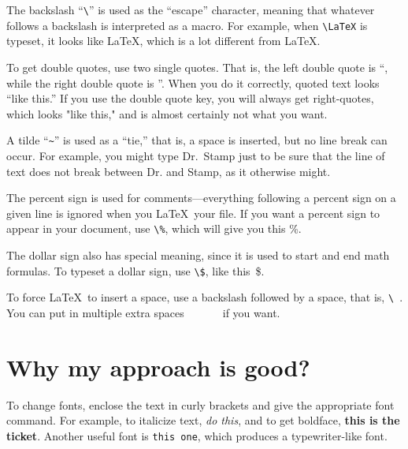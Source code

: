 The backslash ``\verb+\+'' is used 
as the ``escape'' character, meaning that
whatever follows a backslash is interpreted as a macro.
For example, when \verb+\LaTeX+ is typeset, it looks like \LaTeX, which 
is a lot different from LaTeX.

To get double quotes, use two single quotes. That is, the left double quote is ``, while the right double
quote is ''. When you do it correctly, quoted text looks ``like this.''
If you use the double quote key, you will always get right-quotes, which looks "like this," and is
almost certainly not what you want.

A tilde ``\verb+~+'' is used as a ``tie,'' that is, a space is inserted, but no line break can occur.
For example, you might type Dr.~Stamp just to be sure that the line of text
does not break between Dr. and Stamp, as it otherwise might.

The percent sign is used for comments---everything following a percent sign 
on a given line is ignored when you \LaTeX\ your file. %
If you want a percent sign to appear in your document, use \verb+\%+, 
which will give you this \%.

The dollar sign also has special meaning, since it is used to start and end
math formulas. To typeset a dollar sign, use \verb+\$+, like this~\$.

To force \LaTeX\ to insert a space, use a backslash followed by
a space, that is, \verb+\ +. You can put in multiple extra spaces\ \ \ \ \ \ \ if you want.

\section{Why my approach is good?}

To change fonts, enclose the text in curly brackets and give the appropriate font command.
For example, to italicize text, {\it do this}, and to get boldface, {\bf this is the ticket}.
Another useful font is {\tt this one}, which produces a typewriter-like font.


